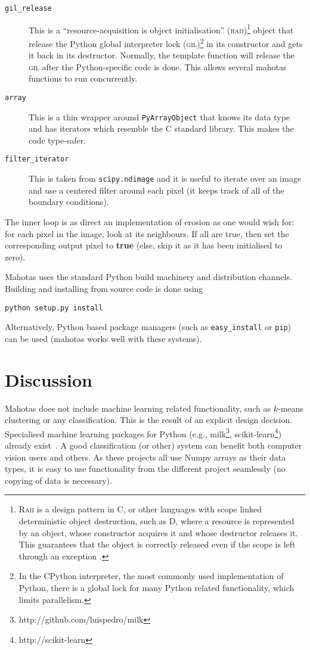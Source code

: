 \documentclass{article}
\newcommand*{\cpp}{{C\nolinebreak[4]\hspace{-.05em}\raisebox{.4ex}{\tiny\textbf{++}}}}
\let\code\texttt
\begin{document}
\begin{description}
\item[\code{gil\_release}] This is a ``resource-acquisition is object
initialisation'' (\textsc{raii})\footnote{\textsc{Raii} is a design pattern in
\cpp{}, or other languages with scope linked deterministic object destruction,
such as D, where a resource is represented by an object, whose constructor
acquires it and whose destructor releases it. This guarantees that the object
is correctly released even if the scope is left through an exception
\citep{Stroustrup1994}.} object that release the Python global interpreter lock
(\textsc{gil})\footnote{In the CPython interpreter, the most commonly used
implementation of Python, there is a global lock for many Python related
functionality, which limits parallelism.} in its constructor and gets it back
in its destructor. Normally, the template function will release the
\textsc{gil} after the Python-specific code is done. This allows several
mahotas functions to run concurrently.
\item[\code{array}] This is a thin wrapper around \code{PyArrayObject} that
knows its data type and has iterators which resemble the \cpp{} standard
library. This makes the code type-safer.
\item[\code{filter\_iterator}] This is taken from \code{scipy.ndimage} and it
is useful to iterate over an image and use a centered filter around each pixel
(it keeps track of all of the boundary conditions).
\end{description}

The inner loop is as direct an implementation of erosion as one would wish for:
for each pixel in the image, look at its neighbours. If all are true, then set
the corresponding output pixel to \textbf{true} (else, skip it as it has been
initialised to zero).

Mahotas uses the standard Python build machinery and distribution channels.
Building and installing from source code is done using
\begin{verbatim}
python setup.py install
\end{verbatim}
Alternatively, Python based package managers (such as \texttt{easy\_install} or
\texttt{pip}) can be used (mahotas works well with these systems).

\section{Discussion}

Mahotas does not include machine learning related functionality, such as
$k$-means clustering or any classification. This is the result of an explicit
design decision. Specialised machine learning packages for Python (e.g.,
milk\footnote{http://github.com/luispedro/milk},
scikit-learn\footnote{http://scikit-learn}) already
exist~\citep{Pedregosa:2011:SML:2078183.2078195}. A good classification (or
other) system can benefit both computer vision users and others. As these
projects all use Numpy arrays as their data types, it is easy to use
functionality from the different project seamlessly (no copying of data is
necessary).
\end{document}
